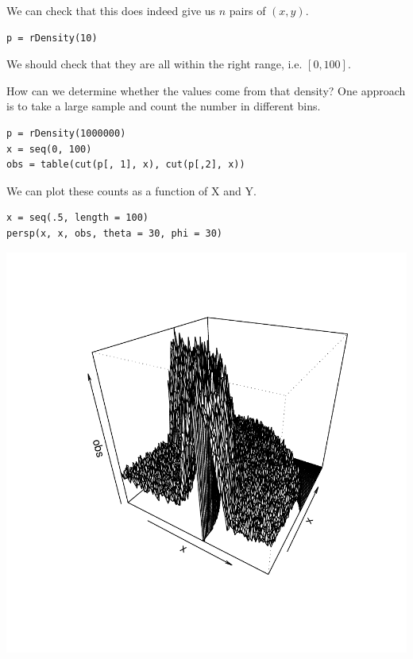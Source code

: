 We can check that this does indeed give us $n$ pairs of $(x, y)$.
\begin{verbatim}
p = rDensity(10)
\end{verbatim}
We should check that they are all within the right range, i.e. $[0,
100]$.

How can we  determine whether the values come from that
density?
One approach is to take a large sample and count the number
in different bins.
\begin{verbatim}
p = rDensity(1000000)
x = seq(0, 100)
obs = table(cut(p[, 1], x), cut(p[,2], x))
\end{verbatim}
We can plot these counts as a function of 
X and Y.
\begin{verbatim}
x = seq(.5, length = 100)
persp(x, x, obs, theta = 30, phi = 30)
\end{verbatim}

\includegraphics{RNG/images/nodeDensitySample.pdf}


